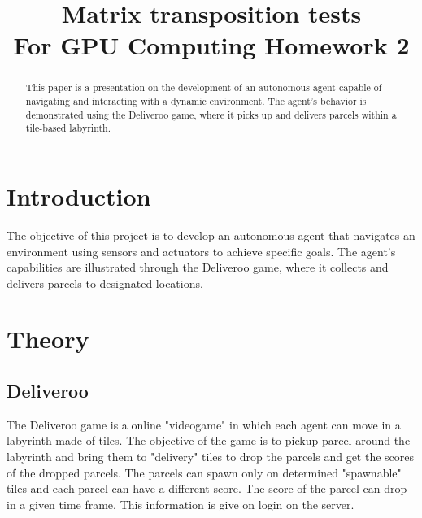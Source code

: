 \documentclass[conference]{IEEEtran}
\begin{document}
\title{Matrix transposition tests\\
{\footnotesize \textsuperscript{}For GPU Computing Homework 2}
}

\author{

\and
{}
}

\maketitle

\begin{abstract}
This paper is a presentation on the development of an autonomous agent capable of navigating and interacting with a dynamic environment. The agent's behavior is demonstrated using the Deliveroo game, where it picks up and delivers parcels within a tile-based labyrinth.\end{abstract}


\section{Introduction}
The objective of this project is to develop an autonomous agent that navigates an environment using sensors and actuators to achieve specific goals. The agent's capabilities are illustrated through the Deliveroo game, where it collects and delivers parcels to designated locations.


\section{Theory}
\subsection{Deliveroo}
The Deliveroo game is a online "videogame" in which each agent can move in a labyrinth made of tiles.
The objective of the game is to pickup parcel around the labyrinth and bring them to "delivery" tiles to drop the parcels and get the scores of the dropped parcels.
The parcels can spawn only on determined  "spawnable" tiles and each parcel can have a different score.
The score of the parcel can drop in a given time frame. This information is give on login on the server.
\end{document}
